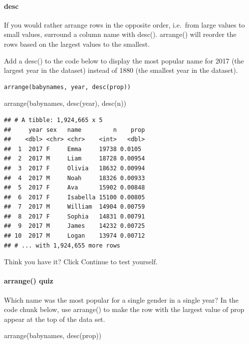 \documentclass[
]{article}
\newenvironment{Shaded}{\begin{snugshade}}{\end{snugshade}}
\newcommand{\FunctionTok}[1]{\textcolor[rgb]{0.00,0.00,0.00}{#1}}
\newcommand{\NormalTok}[1]{#1}
\begin{document}
\hypertarget{desc}{%
\paragraph{desc}\label{desc}}

If you would rather arrange rows in the opposite order, i.e.~from large
values to small values, surround a column name with desc(). arrange()
will reorder the rows based on the largest values to the smallest.

Add a desc() to the code below to display the most popular name for 2017
(the largest year in the dataset) instead of 1880 (the smallest year in
the dataset).

\begin{verbatim}
arrange(babynames, year, desc(prop))
\end{verbatim}

\begin{Shaded}
\begin{Highlighting}[]
\FunctionTok{arrange}\NormalTok{(babynames, }\FunctionTok{desc}\NormalTok{(year), }\FunctionTok{desc}\NormalTok{(n))}
\end{Highlighting}
\end{Shaded}

\begin{verbatim}
## # A tibble: 1,924,665 x 5
##     year sex   name         n    prop
##    <dbl> <chr> <chr>    <int>   <dbl>
##  1  2017 F     Emma     19738 0.0105 
##  2  2017 M     Liam     18728 0.00954
##  3  2017 F     Olivia   18632 0.00994
##  4  2017 M     Noah     18326 0.00933
##  5  2017 F     Ava      15902 0.00848
##  6  2017 F     Isabella 15100 0.00805
##  7  2017 M     William  14904 0.00759
##  8  2017 F     Sophia   14831 0.00791
##  9  2017 M     James    14232 0.00725
## 10  2017 M     Logan    13974 0.00712
## # ... with 1,924,655 more rows
\end{verbatim}

Think you have it? Click Continue to test yourself.

\hypertarget{arrange-quiz}{%
\paragraph{arrange() quiz}\label{arrange-quiz}}

Which name was the most popular for a single gender in a single year? In
the code chunk below, use arrange() to make the row with the largest
value of prop appear at the top of the data set.

\begin{Shaded}
\begin{Highlighting}[]
\FunctionTok{arrange}\NormalTok{(babynames, }\FunctionTok{desc}\NormalTok{(prop))}
\end{Highlighting}
\end{Shaded}
\end{document}
